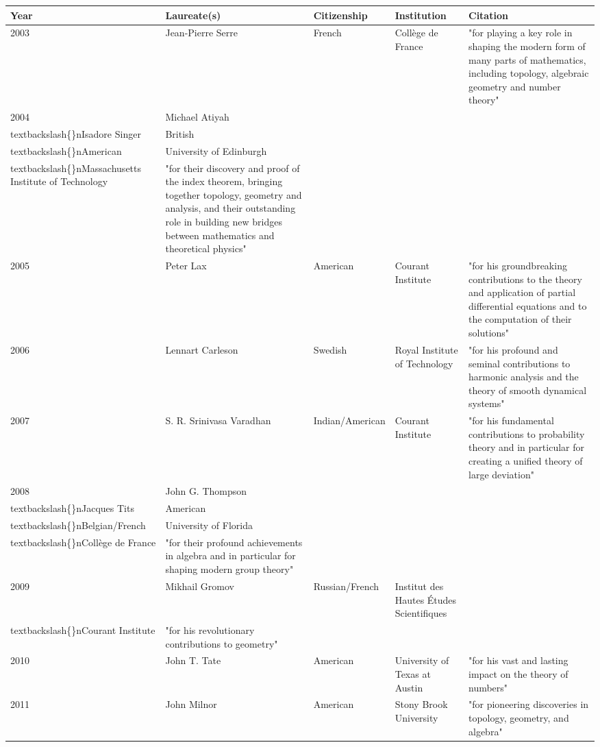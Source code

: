 \documentclass{article}
\begin{document}
\begin{tabular}{lllll}
\toprule
Year & Laureate(s) & Citizenship & Institution & Citation \\
\midrule
2003 & Jean-Pierre Serre & French & Collège de France & "for playing a key role in shaping the modern form of many parts of mathematics, including topology, algebraic geometry and number theory" \\
2004 & Michael Atiyah\\textbackslash\{\}nIsadore Singer & British\\textbackslash\{\}nAmerican & University of Edinburgh\\textbackslash\{\}nMassachusetts Institute of Technology & "for their discovery and proof of the index theorem, bringing together topology, geometry and analysis, and their outstanding role in building new bridges between mathematics and theoretical physics" \\
2005 & Peter Lax & American & Courant Institute & "for his groundbreaking contributions to the theory and application of partial differential equations and to the computation of their solutions" \\
2006 & Lennart Carleson & Swedish & Royal Institute of Technology & "for his profound and seminal contributions to harmonic analysis and the theory of smooth dynamical systems" \\
2007 & S. R. Srinivasa Varadhan & Indian/American & Courant Institute & "for his fundamental contributions to probability theory and in particular for creating a unified theory of large deviation" \\
2008 & John G. Thompson\\textbackslash\{\}nJacques Tits & American\\textbackslash\{\}nBelgian/French & University of Florida\\textbackslash\{\}nCollège de France & "for their profound achievements in algebra and in particular for shaping modern group theory" \\
2009 & Mikhail Gromov & Russian/French & Institut des Hautes Études Scientifiques\\textbackslash\{\}nCourant Institute & "for his revolutionary contributions to geometry" \\
2010 & John T. Tate & American & University of Texas at Austin & "for his vast and lasting impact on the theory of numbers" \\
2011 & John Milnor & American & Stony Brook University & "for pioneering discoveries in topology, geometry, and algebra" \\

\end{tabular}
\end{document}
